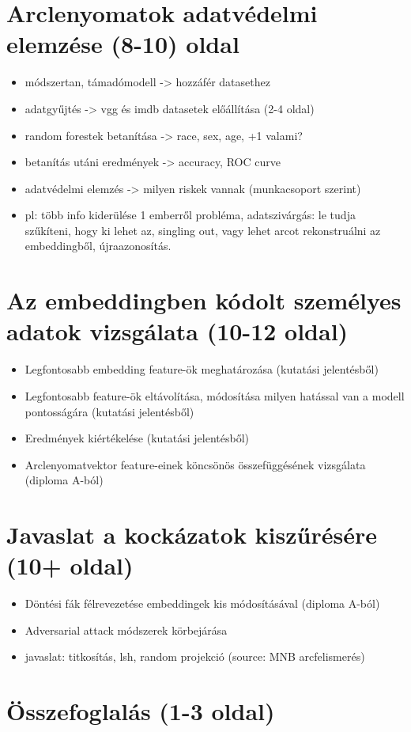 \section{Arclenyomatok adatvédelmi elemzése (8-10) oldal}
\begin{itemize}
	\item módszertan, támadómodell -> hozzáfér datasethez
	\item adatgyűjtés -> vgg és imdb datasetek előállítása (2-4 oldal)
	\item random forestek betanítása -> race, sex, age, +1 valami?
	\item betanítás utáni eredmények -> accuracy, ROC curve
	\item adatvédelmi elemzés -> milyen riskek vannak (munkacsoport szerint)
	\item pl: több info kiderülése 1 emberről probléma, adatszivárgás: le tudja szűkíteni, hogy ki lehet az, singling out, vagy lehet arcot rekonstruálni az embeddingből, újraazonosítás.
\end{itemize}

\section{Az embeddingben kódolt személyes adatok vizsgálata (10-12 oldal)}
\begin{itemize}
	\item Legfontosabb embedding feature-ök meghatározása (kutatási jelentésből)
	\item Legfontosabb feature-ök eltávolítása, módosítása milyen hatással van a modell pontosságára (kutatási jelentésből) 
	\item Eredmények kiértékelése (kutatási jelentésből) 
	\item Arclenyomatvektor feature-einek köncsönös összefüggésének vizsgálata (diploma A-ból)
\end{itemize}


\section{Javaslat a kockázatok kiszűrésére (10+ oldal)}
\begin{itemize}
	\item Döntési fák félrevezetése embeddingek kis módosításával (diploma A-ból)
	\item Adversarial attack módszerek körbejárása
	\item javaslat: titkosítás, lsh, random projekció (source: MNB arcfelismerés)
\end{itemize}

\section{Összefoglalás (1-3 oldal)}
